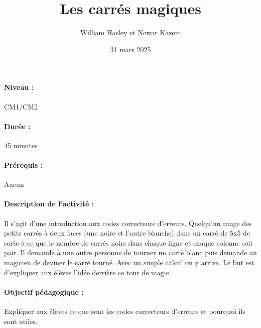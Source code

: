 \documentclass[12pt, a4paper]{article}
\begin{document}
	
	\title{Les carrés magiques}
	\author{William Hasley et Nowar Kazem}
	\date{31 mars 2025}
	\maketitle
	
	\paragraph*{Niveau :} CM1/CM2 
	\paragraph*{Durée :} 45 minutes
	\paragraph*{Prérequis :} Aucun
	\paragraph*{Description de l'activité :}
	Il s'agit d'une introduction aux codes correcteurs d'erreurs. Quelqu'un range des petits carrés à deux faces (une noire et l'autre blanche) dans un carré de 5x5 de 
	sorte à ce que le nombre de carrés noirs dans chaque ligne et chaque colonne soit pair. Il demande à une autre personne de tourner un carré blanc puis demande au magicien 
	de deviner le carré tourné. Avec un simple calcul on y arrive. Le but est d'expliquer aux élèves l'idée derrière ce tour de magie.
	 
	
	\paragraph*{Objectif pédagogique :}
	Expliquer aux élèves ce que sont les codes correcteurs d'erreurs et pourquoi ils sont utiles.
	
\end{document}

